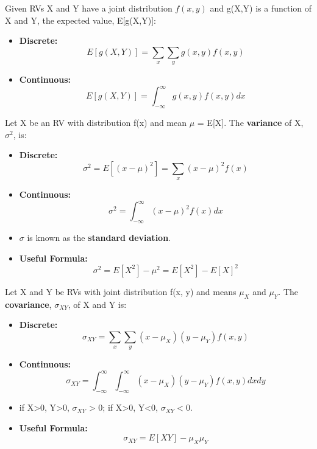 \documentclass[10pt, letterpaper, twoside]{article}
\begin{document}
\begin{multicols}{2}
Given RVs X and Y have a joint distribution $f(x,y)$ and g(X,Y) is a function of X and Y, the expected value, E[g(X,Y)]:
\begin{itemize}
    \item \textbf{Discrete:}
    \begin{equation*}
        E[g(X,Y)] = \sum_x\sum_yg(x,y)f(x,y)
    \end{equation*}
    \item\textbf{Continuous:}
    \begin{equation*}
        E[g(X,Y)] = \int_{-\infty}^{\infty}g(x,y)f(x,y)dx
    \end{equation*}
\end{itemize}

Let X be an RV with distribution f(x) and mean $\mu$ = E[X]. The \textbf{variance} of X, $\sigma^2$, is:
\begin{itemize}
    \item \textbf{Discrete:}
        \begin{equation*}
        \sigma^2 = E[(x-\mu)^2] = \sum_x(x-\mu)^2f(x)
        \end{equation*}
    \item \textbf{Continuous:}
        \begin{equation*}
            \sigma^2 = \int_{-\infty}^{\infty}(x-\mu)^2f(x)dx
        \end{equation*}
    \item $\sigma$ is known as the \textbf{standard deviation}.
    \item \textbf{Useful Formula:}
    \begin{equation*}
        \sigma^2 = E[X^2]- \mu^2 = E[X^2] - E[X]^2
    \end{equation*}
\end{itemize}

Let X and Y be RVs with joint distribution f(x, y) and means $\mu_X$ and $\mu_Y$. The \textbf{covariance}, $\sigma_{XY}$, of X and Y is:

\begin{itemize}
    \item \textbf{Discrete:}
        \begin{equation*}
            \sigma_{XY} = \sum_x\sum_y(x-\mu_X)(y-\mu_Y)f(x,y)
        \end{equation*}
    \item \textbf{Continuous:}
        \begin{equation*}
            \sigma_{XY} = \int_{-\infty}^{\infty}\int_{-\infty}^{\infty}(x-\mu_X)(y-\mu_Y)f(x,y) dxdy
        \end{equation*}
    \item if X>0, Y>0, $\sigma_{XY}$ > 0; if X>0, Y<0, $\sigma_{XY} < 0$.
    \item \textbf{Useful Formula:}
    \begin{equation*}
        \sigma_{XY} = E[XY] - \mu_X\mu_Y
    \end{equation*}
\end{itemize}


\end{multicols}
\end{document}
